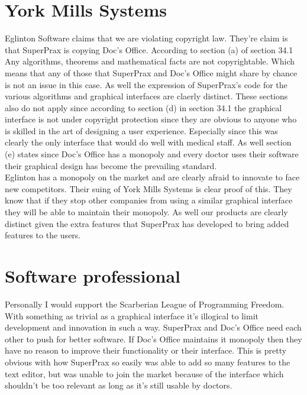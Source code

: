 \documentclass{article}
\begin{document}
\section{York Mills Systems}
Eglinton Software claims that we are violating copyright law. They're claim is
that SuperPrax is copying Doc's Office. According to section (a) of section 34.1
Any algorithms, theorems and mathematical facts are not copyrightable. Which
means that any of those that SuperPrax and Doc's Office might share by chance
is not an issue in this case. As well the expression of SuperPrax's code for the
various algorithms and graphical interfaces are claerly distinct. These sections
also do not apply since according to section (d) in section 34.1 the graphical
interface is not under copyright protection since they are obvious to anyone who
is skilled in the art of designing a user experience. Especially since this was
clearly the only interface that would do well with medical staff. As well
section (e) states since Doc's Office has a monopoly and every doctor uses their
software their graphical design has become the prevailing standard.\\

Eglinton has a monopoly on the market and are clearly afraid to innovate to face
new competitors. Their suing of York Mills Systems is clear proof of this. They
know that if they stop other companies from using a similar graphical interface
they will be able to maintain their monopoly. As well our products are clearly
distinct given the extra features that SuperPrax has developed to bring added
features to the users. 
\section{Software professional}
Personally I would support the Scarberian League of Programming Freedom. With
something as trivial as a graphical interface it's illogical to limit
development and innovation in such a way. SuperPrax and Doc's Office need each
other to push for better software. If Doc's Office maintains it monopoly then
they have no reason to improve their functionality or their interface. This is
pretty obvious with how SuperPrax so easily was able to add so many features to
the text editor, but was unable to join the market because of the interface
which shouldn't be too relevant as long as it's still usable by doctors.
\end{document}
